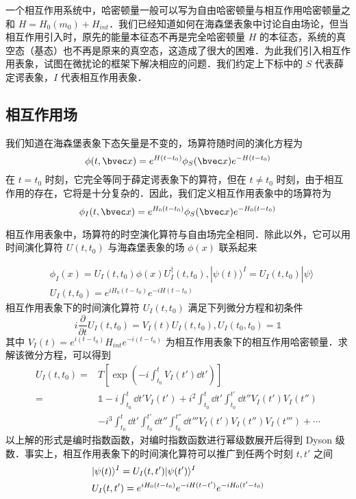 
一个相互作用系统中，哈密顿量一般可以写为自由哈密顿量与相互作用哈密顿量之和 $H=H_0(m_0)+H_{int}$．我们已经知道如何在海森堡表象中讨论自由场论，但当相互作用引入时，原先的能量本征态不再是完全哈密顿量 $H$ 的本征态，系统的真空态（基态）也不再是原来的真空态，这造成了很大的困难．为此我们引入相互作用表象，试图在微扰论的框架下解决相应的问题．我们约定上下标中的 $S$ 代表薛定谔表象，$I$ 代表相互作用表象．
\subsection{相互作用场}
我们知道在海森堡表象下态矢量是不变的，场算符随时间的演化方程为
\begin{equation}
\phi(t,\bvec x)=e^{H(t-t_0)}\phi_S(\bvec x)e^{-H(t-t_0)}
\end{equation}
在 $t=t_0$ 时刻，它完全等同于薛定谔表象下的算符，但在 $t\neq t_0$ 时刻，由于相互作用的存在，它将是十分复杂的．因此，我们定义相互作用表象中的场算符为
\begin{equation}
\phi_I(t,\bvec x)=e^{H_0(t-t_0)}\phi_S(\bvec x)e^{-H_0(t-t_0)}
\end{equation}

相互作用表象中，场算符的时空演化算符与自由场完全相同．除此以外，它可以用时间演化算符 $U(t,t_0)$ 与海森堡表象的场 $\phi(x)$ 联系起来

\begin{equation}
\begin{aligned}
&\phi_I(x)=U_I(t,t_0)\phi(x)U_I^\dagger(t,t_0),|\psi(t)\rangle^I=U_I(t,t_0)|\psi\rangle\\ 
&U_I(t,t_0)=e^{iH_0(t-t_0)}e^{-iH(t-t_0)}
\end{aligned}
\end{equation}
相互作用表象下的时间演化算符 $U_I(t,t_0)$ 满足下列微分方程和初条件
\begin{equation}
i\frac{\partial}{\partial t}U_I(t,t_0)=V_I(t)U_I(t,t_0), U_I(t_0,t_0)=\mathbb{1}
\end{equation}
其中 $V_I(t)=e^{i(t-t_0)}H_{int} e^{-i(t-t_0)}$ 为相互作用表象下的相互作用哈密顿量．求解该微分方程，可以得到
\begin{equation}
\begin{aligned}
U_I(t,t_0)=&T\left[\exp\left(-i\int_{t_0}^{t}V_I(t')\dd t'\right)\right]\\
=&\mathbb{1}-i\int_{t_0}^t \dd t' V_I(t')+i^2\int_{t_0}^t \dd t'  \int_{t_0}^{t'} \dd t'' V_I(t')V_I(t'') \\
 &-i^3\int_{t_0}^t \dd t'  \int_{t_0}^{t'} \dd t'' \int_{t_0}^{t''}\dd t''' V_I(t')V_I(t'')V_I(t''')+\cdots
\end{aligned}
\end{equation}
以上解的形式是编时指数函数，对编时指数函数进行幂级数展开后得到 Dyson 级数．事实上，相互作用表象下的时间演化算符可以推广到任两个时刻 $t,t'$ 之间
\begin{equation}
\begin{aligned}
\notag& |\psi(t)\rangle^I=U_I(t,t')|\psi(t')\rangle^I\\
& U_I(t,t')=e^{iH_0(t-t_0)}e^{-iH(t-t')}e^{-iH_0(t'-t_0)}
\end{aligned}
\end{equation}